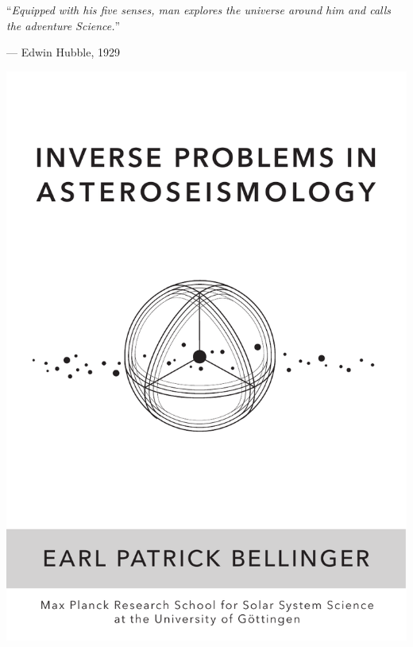 
\clearpage
\thispagestyle{empty}
\vspace*{3.8cm}
\hspace*{0.5cm}\begin{minipage}[c]{0.5\linewidth}
\epigraph{``\emph{Equipped with his five senses, man explores the universe around him and calls \phantom{``}the adventure Science.}''}{--- Edwin Hubble, 1929}
\end{minipage}
\vspace*{3cm}%
\begin{center}
\begin{minipage}[c]{0.66\linewidth}%
\begin{center}%
\includegraphics[width=\linewidth,trim={1cm 7cm 1.55cm 7cm},clip]{thesis_logo.pdf}%
\end{center}
\end{minipage}
\end{center}
